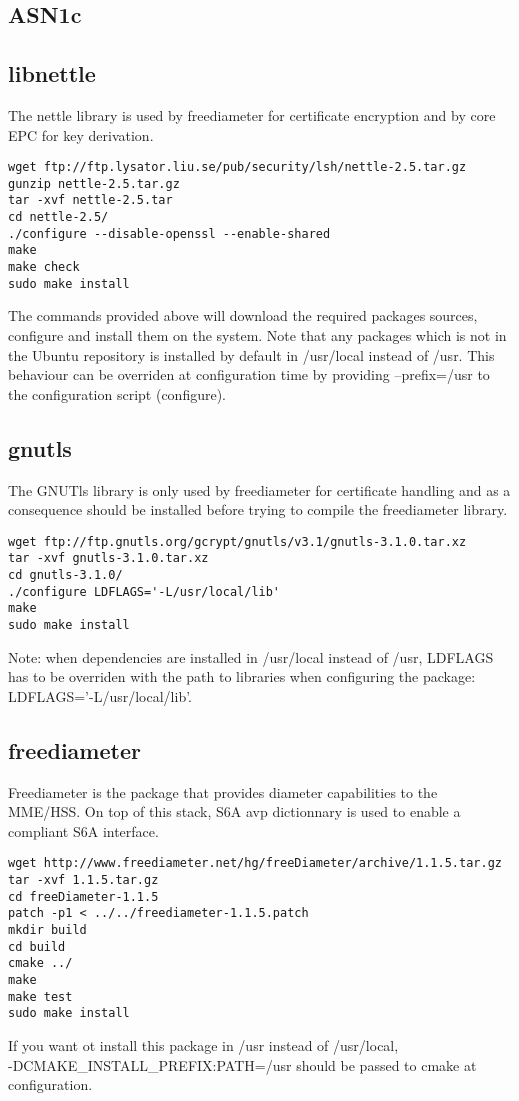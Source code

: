 \documentclass[a4paper,oneside]{report}
\begin{document}
\subsection{ASN1c}
\label{sec:asn1c}

\subsection{libnettle}
\label{sec:libnettle}

The nettle library is used by freediameter for certificate encryption and by core
EPC for key derivation.
\begin{lstlisting}
wget ftp://ftp.lysator.liu.se/pub/security/lsh/nettle-2.5.tar.gz
gunzip nettle-2.5.tar.gz
tar -xvf nettle-2.5.tar
cd nettle-2.5/
./configure --disable-openssl --enable-shared
make
make check
sudo make install
\end{lstlisting}
The commands provided above will download the required packages sources, configure
and install them on the system.
Note that any packages which is not in the Ubuntu repository is installed by default
in /usr/local instead of /usr.
This behaviour can be overriden at configuration time by providing --prefix=/usr to
the configuration script (configure).

\subsection{gnutls}
\label{sec:gnutls}

The GNUTls library is only used by freediameter for certificate handling and as a
consequence should be installed before trying to compile the freediameter library.
\begin{lstlisting}
wget ftp://ftp.gnutls.org/gcrypt/gnutls/v3.1/gnutls-3.1.0.tar.xz
tar -xvf gnutls-3.1.0.tar.xz
cd gnutls-3.1.0/
./configure LDFLAGS='-L/usr/local/lib'
make
sudo make install
\end{lstlisting}
Note: when dependencies are installed in /usr/local instead of /usr,
LDFLAGS has to be overriden with the path to libraries when configuring the package:
LDFLAGS='-L/usr/local/lib'.

\subsection{freediameter}
\label{sec:freediameter}
Freediameter is the package that provides diameter capabilities to the MME/HSS.
On top of this stack, S6A avp dictionnary is used to enable a compliant S6A interface.
\begin{lstlisting}
wget http://www.freediameter.net/hg/freeDiameter/archive/1.1.5.tar.gz
tar -xvf 1.1.5.tar.gz
cd freeDiameter-1.1.5
patch -p1 < ../../freediameter-1.1.5.patch
mkdir build
cd build
cmake ../
make
make test
sudo make install
\end{lstlisting}
If you want ot install this package in /usr instead of /usr/local,\\
-DCMAKE\_INSTALL\_PREFIX:PATH=/usr should be passed to cmake at configuration.
\end{document}

